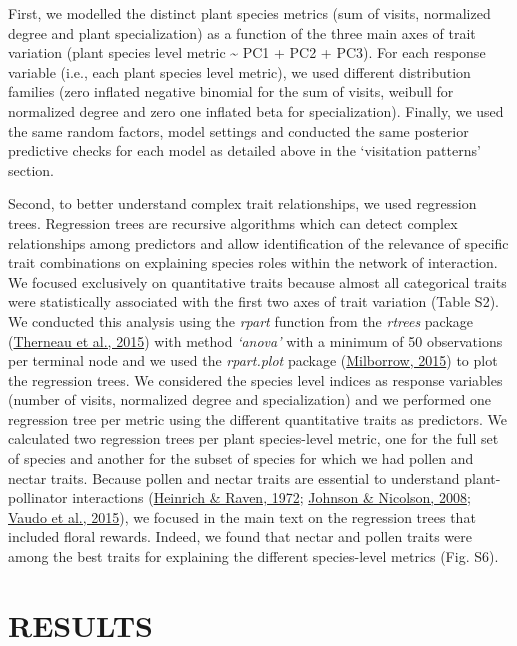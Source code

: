 \documentclass[
  12pt,
  a4paper,
]{article}
\begin{document}
First, we modelled the distinct plant species metrics (sum of visits, normalized degree and plant specialization) as a function of the three main axes of trait variation (plant species level metric \textasciitilde{} PC1 + PC2 + PC3). For each response variable (i.e., each plant species level metric), we used different distribution families (zero inflated negative binomial for the sum of visits, weibull for normalized degree and zero one inflated beta for specialization). Finally, we used the same random factors, model settings and conducted the same posterior predictive checks for each model as detailed above in the `visitation patterns' section.

Second, to better understand complex trait relationships, we used regression trees. Regression trees are recursive algorithms which can detect complex relationships among predictors and allow identification of the relevance of specific trait combinations on explaining species roles within the network of interaction. We focused exclusively on quantitative traits because almost all categorical traits were statistically associated with the first two axes of trait variation (Table S2). We conducted this analysis using the \emph{rpart} function from the \emph{rtrees} package (\protect\hyperlink{ref-therneau2015}{Therneau et al., 2015}) with method \emph{`anova'} with a minimum of 50 observations per terminal node and we used the \emph{rpart.plot} package (\protect\hyperlink{ref-milborrow2015}{Milborrow, 2015}) to plot the regression trees. We considered the species level indices as response variables (number of visits, normalized degree and specialization) and we performed one regression tree per metric using the different quantitative traits as predictors. We calculated two regression trees per plant species-level metric, one for the full set of species and another for the subset of species for which we had pollen and nectar traits. Because pollen and nectar traits are essential to understand plant-pollinator interactions (\protect\hyperlink{ref-heinrich1972}{Heinrich \& Raven, 1972}; \protect\hyperlink{ref-johnson2008}{Johnson \& Nicolson, 2008}; \protect\hyperlink{ref-vaudo2015}{Vaudo et al., 2015}), we focused in the main text on the regression trees that included floral rewards. Indeed, we found that nectar and pollen traits were among the best traits for explaining the different species-level metrics (Fig. S6).

\hypertarget{results}{%
\section{RESULTS}\label{results}}
\end{document}
